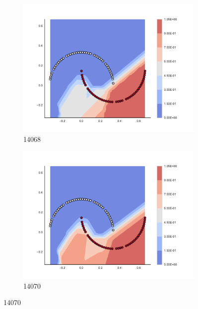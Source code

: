\begin{figure}[h]
\begin{subfigure}[b]{0.09\textwidth}
    \includegraphics[clip, trim=2.35cm 1.75cm 4.5cm 0cm,width=\textwidth]{img/convergence/14068.pdf}
    \caption{14068}
    \label{fig:convergence_14068}
\end{subfigure}
%
\begin{subfigure}[b]{0.09\textwidth}
    \includegraphics[clip, trim=2.35cm 1.75cm 4.5cm 0cm,width=\textwidth]{img/convergence/14070.pdf}
    \caption{14070}
    \label{fig:convergence_14070}
\end{subfigure}
%
        \end{figure}

